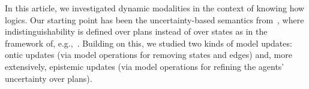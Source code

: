 \begin{comment}
In this paper we investigated dynamic modalities in the context of \emph{knowing how} logics. Our starting point has been the uncertainty-based semantics from~\cite{AFSVQ21,AFSVQ23report}. 
Building on this, we studied two forms of updates: ontic updates, via annoucement-like and arrow-update-like modalities; and epistemic updates, refining the perception of an agent regarding her own abilities. For the operators encompassed in the former family, we showed that in their general form, they increase the expressivity of the logic. Moreover, we restricted ourselves to a particular class of models and we provided axiomatizations via reduction axioms. For the latter family, we discussed some preliminary thoughts and semantic properties of each operator, and we discussed some limitations of this setting. Concretely, we showed that the presented logics lack uniform substitution, a typical property that is used to obtain complete axiomatizations. To deal with this issue, we presented an extended, underlying static language, and then proposed some dynamic modalities for epistemic updates. This contribution is completely novel with respect to~\cite{AFSV22}. Here, we presented a modality that makes a single plan  distinguishable from any other from the perspective of the agents. 
In this extended setting, apart from showing how it could be useful for the examples we introduced, we obtained sound and complete axiomatizations via reduction axioms, and showed that the satisfiability problem for these logics is decidable. 
\end{comment}

In this article, we investigated dynamic modalities in the context of knowing how logics. Our starting point has been the uncertainty-based semantics from~\cite{AFSVQ21,AFSVQ23report}, where indistinguishability is defined over plans instead of over states as in the framework of, e.g.,~\cite{FervariHLW17,LiW24}. Building on this, we studied two kinds of model updates: ontic updates (via model operations for removing states and edges) and, more extensively, epistemic updates (via model operations for refining the agents' uncertainty over plans). 

